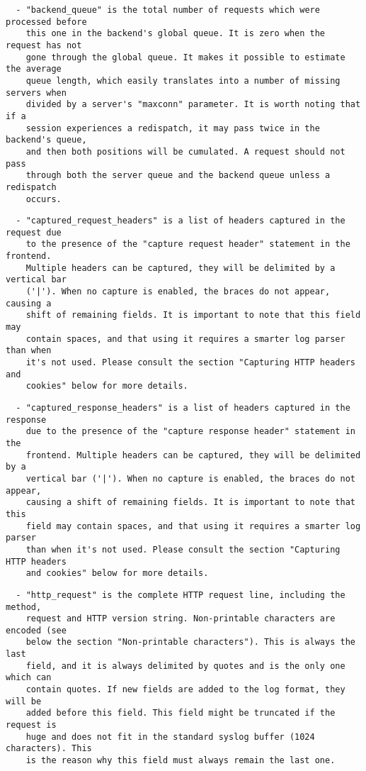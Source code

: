 \begin{verbatim}
  - "backend_queue" is the total number of requests which were processed before
    this one in the backend's global queue. It is zero when the request has not
    gone through the global queue. It makes it possible to estimate the average
    queue length, which easily translates into a number of missing servers when
    divided by a server's "maxconn" parameter. It is worth noting that if a
    session experiences a redispatch, it may pass twice in the backend's queue,
    and then both positions will be cumulated. A request should not pass
    through both the server queue and the backend queue unless a redispatch
    occurs.
\end{verbatim}

\begin{verbatim}
  - "captured_request_headers" is a list of headers captured in the request due
    to the presence of the "capture request header" statement in the frontend.
    Multiple headers can be captured, they will be delimited by a vertical bar
    ('|'). When no capture is enabled, the braces do not appear, causing a
    shift of remaining fields. It is important to note that this field may
    contain spaces, and that using it requires a smarter log parser than when
    it's not used. Please consult the section "Capturing HTTP headers and
    cookies" below for more details.
\end{verbatim}

\begin{verbatim}
  - "captured_response_headers" is a list of headers captured in the response
    due to the presence of the "capture response header" statement in the
    frontend. Multiple headers can be captured, they will be delimited by a
    vertical bar ('|'). When no capture is enabled, the braces do not appear,
    causing a shift of remaining fields. It is important to note that this
    field may contain spaces, and that using it requires a smarter log parser
    than when it's not used. Please consult the section "Capturing HTTP headers
    and cookies" below for more details.
\end{verbatim}

\begin{verbatim}
  - "http_request" is the complete HTTP request line, including the method,
    request and HTTP version string. Non-printable characters are encoded (see
    below the section "Non-printable characters"). This is always the last
    field, and it is always delimited by quotes and is the only one which can
    contain quotes. If new fields are added to the log format, they will be
    added before this field. This field might be truncated if the request is
    huge and does not fit in the standard syslog buffer (1024 characters). This
    is the reason why this field must always remain the last one.
\end{verbatim}

